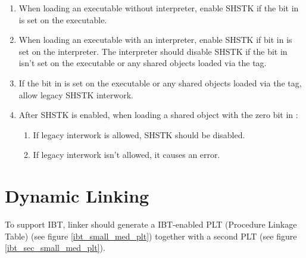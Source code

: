 \begin{enumerate}
  \item
    \begin{sloppypar}
      When loading an executable without interpreter, enable SHSTK if
      the  bit in
       is set on the executable.
    \end{sloppypar}
  \item
    \begin{sloppypar}
      When loading an executable with an interpreter, enable SHSTK if
       bit in
       is set on the interpreter.
      The interpreter should disable SHSTK if the
       bit in
       isn't set on the executable
      or any shared objects loaded via the  tag.
    \end{sloppypar}
   \item If the  bit in
      is set on the
     executable or any shared objects loaded via the
      tag, allow legacy SHSTK interwork.
  \item
    \begin{sloppypar}
      After SHSTK is enabled, when loading a shared object with the
      zero  bit in
      :
    \end{sloppypar}
    \begin{enumerate}
      \item If legacy interwork is allowed, SHSTK should be disabled.
      \item If legacy interwork isn't allowed, it causes an error.
    \end{enumerate}
\end{enumerate}

\section{Dynamic Linking}

To support IBT, linker should generate a IBT-enabled PLT (Procedure
Linkage Table) (see figure \ref{ibt_small_med_plt}) together with a second
PLT (see figure \ref{ibt_sec_small_med_plt}).


